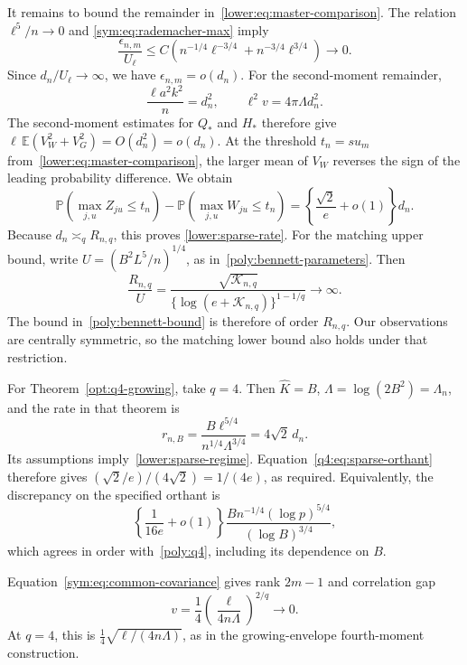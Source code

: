 \documentclass[11pt,letterpaper]{article}
\newenvironment{recovered}{}{}
\theoremstyle{remark}
\newcommand{\E}{\mathbb E}
\newcommand{\Pp}{\mathbb P}
\begin{document}
It remains to bound the remainder
in~\eqref{lower:eq:master-comparison}. The relation \(\ell^5/n\to0\) and
\eqref{sym:eq:rademacher-max} imply
\[
 \frac{\epsilon_{n,m}}{U_\ell}
 \le C\left(n^{-1/4}\ell^{-3/4}
             +n^{-3/4}\ell^{3/4}\right)\longrightarrow0.
\]
Since \(d_n/U_\ell\to\infty\), we have \(\epsilon_{n,m}=o(d_n)\).
For the second-moment remainder,
\[
 \frac{\ell a^2k^2}{n}=d_n^2,\qquad
 \ell^2v=4\pi\Lambda d_n^2.
\]
\begin{recovered}
The second-moment estimates for \(Q_*\) and \(H_*\) therefore give
\(\ell\,\E(V_W^2+V_G^2)=O(d_n^2)=o(d_n)\).
At the threshold \(t_n=su_m\) from~\eqref{lower:eq:master-comparison},
the larger mean of \(V_W\) reverses the sign of the leading
probability difference. We obtain
\end{recovered}
\begin{equation}
 \Pp(\max_{j,u}Z_{ju}\le t_n)-\Pp(\max_{j,u}W_{ju}\le t_n)
 =\left\{\frac{\sqrt2}{e}+o(1)\right\}d_n.
 \label{q4:eq:sparse-orthant}
\end{equation}
Because \(d_n\asymp_q R_{n,q}\), this proves
\eqref{lower:sparse-rate}. For the matching upper bound, write
\(U=(B^2L^5/n)^{1/4}\), as in~\eqref{poly:bennett-parameters}.
Then
\[
 \frac{R_{n,q}}{U}
 =\frac{\sqrt{\mathcal K_{n,q}}}
        {\{\log(e+\mathcal K_{n,q})\}^{1-1/q}}\longrightarrow\infty.
\]
The bound in~\eqref{poly:bennett-bound} is therefore of order
\(R_{n,q}\). Our observations are centrally symmetric, so the
matching lower bound also holds under that restriction.

For Theorem~\ref{opt:q4-growing}, take \(q=4\).
Then \(\widehat K=B\), \(\Lambda=\log(2B^2)=\Lambda_n\), and
the rate in that theorem is
\[
 r_{n,B}=\frac{B\ell^{5/4}}{n^{1/4}\Lambda^{3/4}}
         =4\sqrt2\,d_n.
\]
Its assumptions imply~\eqref{lower:sparse-regime}.
Equation~\eqref{q4:eq:sparse-orthant} therefore gives
\((\sqrt2/e)/(4\sqrt2)=1/(4e)\), as required. Equivalently, the discrepancy on the
specified orthant is
\[
 \left\{\frac1{16e}+o(1)\right\}
 \frac{B n^{-1/4}(\log p)^{5/4}}{(\log B)^{3/4}},
\]
which agrees in order with~\eqref{poly:q4}, including its dependence on \(B\).

Equation~\eqref{sym:eq:common-covariance} gives rank \(2m-1\)
and correlation gap
\[
 v=\frac14\left(\frac{\ell}{4n\Lambda}\right)^{2/q}\to0.
\]
At \(q=4\), this is
\(\frac14\sqrt{\ell/(4n\Lambda)}\), as in the growing-envelope
fourth-moment construction.


\end{document}
